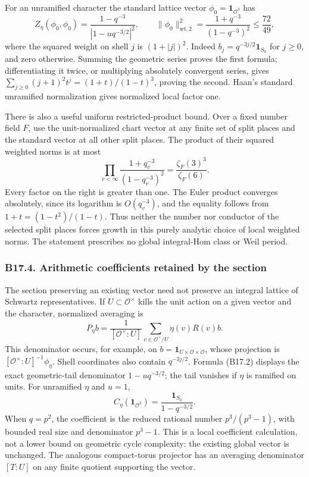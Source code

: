 \documentclass[11pt,a4paper]{article}
\theoremstyle{definition}
\begin{document}
For an unramified character the standard lattice vector \(\phi_0=\mathbf1_{\mathcal O^3}\) has \[
 Z_\eta(\phi_0,\phi_0)=\frac{1-q^{-3}}{|1-uq^{-3/2}|^2},\qquad
 \|\phi_0\|_{\mathrm{wt},2}^2
 =\frac{1+q^{-3}}{(1-q^{-3})^2}\le\frac{72}{49},
\tag{B17.7}
\] where the squared weight on shell \(j\) is \((1+|j|)^2\). Indeed \(b_j=q^{-3j/2}\mathbf1_{S_0}\) for \(j\ge0\), and zero otherwise. Summing the geometric series proves the first formula; differentiating it twice, or multiplying absolutely convergent series, gives \(\sum_{j\ge0}(j+1)^2t^j=(1+t)/(1-t)^3\), proving the second. Haan's standard unramified normalization gives normalized local factor one.

There is also a useful uniform restricted-product bound. Over a fixed number field \(F\), use the unit-normalized chart vector at any finite set of split places and the standard vector at all other split places. The product of their squared weighted norms is at most \[
 \prod_{v<\infty}\frac{1+q_v^{-3}}{(1-q_v^{-3})^2}
 =\frac{\zeta_F(3)^3}{\zeta_F(6)}.
\tag{B17.8}
\] Every factor on the right is greater than one. The Euler product converges absolutely, since its logarithm is \(O(q_v^{-3})\), and the equality follows from \(1+t=(1-t^2)/(1-t)\). Thus neither the number nor conductor of the selected split places forces growth in this purely analytic choice of local weighted norms. The statement prescribes no global integral-Hom class or Weil period.

\subsubsection{B17.4. Arithmetic coefficients retained by the section}\label{b17.4.-arithmetic-coefficients-retained-by-the-section}

The section preserving an existing vector need not preserve an integral lattice of Schwartz representatives. If \(U\subset\mathcal O^\times\) kills the unit action on a given vector and the character, normalized averaging is \[
 P_\eta b=\frac1{[\mathcal O^\times:U]}
       \sum_{v\in\mathcal O^\times/U}\eta(v)R(v)b.
\tag{B17.9}
\] This denominator occurs, for example, on \(b=\mathbf1_{U\times\mathcal O\times\mathcal O}\), whose projection is \([\mathcal O^\times:U]^{-1}\phi_\eta\). Shell coordinates also contain \(q^{-3j/2}\). Formula (B17.2) displays the exact geometric-tail denominator \(1-uq^{-3/2}\); the tail vanishes if \(\eta\) is ramified on units. For unramified \(\eta\) and \(u=1\), \[
 C_\eta(\mathbf1_{\mathcal O^3})
       =\frac{\mathbf1_{S_0}}{1-q^{-3/2}}.
\tag{B17.10}
\] When \(q=p^2\), the coefficient is the reduced rational number \(p^3/(p^3-1)\), with bounded real size and denominator \(p^3-1\). This is a local coefficient calculation, not a lower bound on geometric cycle complexity: the existing global vector is unchanged. The analogous compact-torus projector has an averaging denominator \([T:U]\) on any finite quotient supporting the vector.
\end{document}
